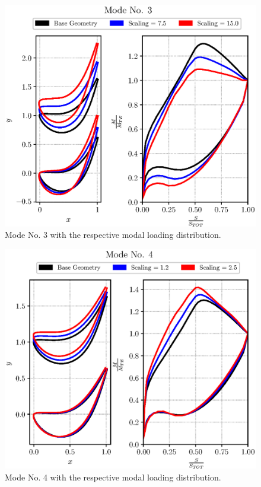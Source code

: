 \begin{figure}[H]
    \centering
    \includegraphics[scale=\scaleBlade]{./images/mode03.eps}
    \caption{Mode No. 3 with the respective modal loading distribution.}
    \label{fig:PCAmode3}
\end{figure} 

\begin{figure}[H]
    \centering
    \includegraphics[scale=\scaleBlade]{./images/mode04.eps}
    \caption{Mode No. 4 with the respective modal loading distribution.}
    \label{fig:PCAmode4}
\end{figure}

